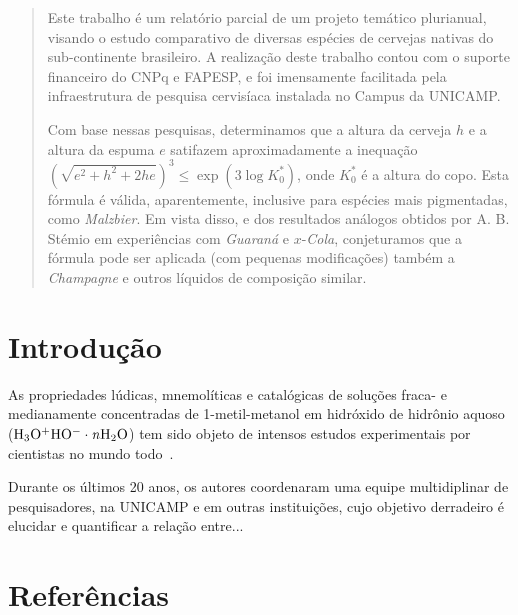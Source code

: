 \documentclass[11pt,twoside]{article}
\begin{document}

    \begin{abstract}
        Este trabalho é um relatório parcial de um projeto temático
        plurianual, visando o estudo comparativo de diversas espécies de
        cervejas nativas do sub-continente brasileiro.  A realização deste
        trabalho contou com o suporte financeiro do CNPq e FAPESP, e foi
        imensamente facilitada pela infraestrutura de pesquisa cervisíaca
        instalada no Campus da UNICAMP.

        Com base nessas pesquisas, determinamos que a altura da cerveja $h$
        e a altura da espuma $e$ satifazem aproximadamente a inequação
        $(\sqrt{e^2 + h^2 + 2 h e})^3 \leq \exp(3 \log K_0^\ast)$, onde
        $K_0^\ast$ é a altura do copo.  Esta fórmula é válida,
        aparentemente, inclusive para espécies mais pigmentadas, como {\em
        Malzbier}.  Em vista disso, e dos resultados análogos obtidos por
        A. B. Stémio em experiências com {\em Guaraná} e $x$-{\em Cola},
        conjeturamos que a fórmula pode ser aplicada (com pequenas
        modificações) também a {\em Champagne} e outros líquidos de
        composição similar.
    \end{abstract}

    \section{Introdução}

    As propriedades lúdicas, mnemolíticas e catalógicas de
    soluções fraca- e medianamente concentradas de 1-metil-metanol
    em hidróxido de hidrônio aquoso ($\rm H_3O^{+} HO^{-}\cdot {\mathit n}H_2O$)
    tem sido objeto de intensos estudos experimentais por
    cientistas no mundo todo~\cite{teixeira_algorithms_2021}.

    Durante os últimos 20 anos, os autores coordenaram uma equipe
    multidiplinar de pesquisadores, na UNICAMP e em outras instituições,
    cujo objetivo derradeiro é elucidar e quantificar a relação entre...

    \section{Referências}
        \printbibliography
\end{document}
